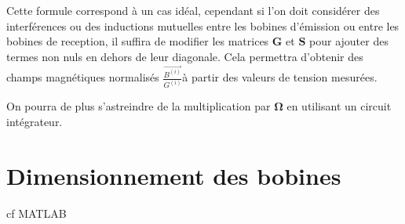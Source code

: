 \documentclass[a4paper,11pt]{article}
\begin{document}
Cette formule correspond à un cas idéal, cependant si l'on doit considérer des interférences ou des inductions mutuelles entre les bobines d'émission ou entre les bobines de reception, il suffira de modifier les matrices $\mathbf{G}$ et $\mathbf{S}$ pour ajouter des termes non nuls en dehors de leur diagonale. Cela permettra d'obtenir des champs magnétiques normalisés $\frac{\Vec{B^{(i)}}}{G^{(i)}}$à partir des valeurs de tension mesurées.

On pourra de plus s'astreindre de la multiplication par $\mathbf{\Omega}$ en utilisant un circuit intégrateur.
\newpage

\section{Dimensionnement des bobines}

cf MATLAB
\end{document}
